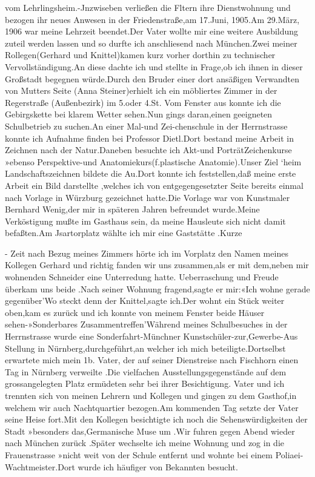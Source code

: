 \documentclass[a4paper,11pt]{article}
\begin{document}
  vom Lehrlingsheim.-Jnzwiseben verließen die Fltern ihre Dienstwohnung und bezogen ihr neues Anwesen in der Friedenstraße,am 17.Juni, 1905.Am 29.März, 1906 war meine Lehrzeit beendet.Der Vater wollte mir eine weitere Ausbildung zuteil werden lassen und so durfte ich anschliesend nach München.Zwei meiner Rollegen(Gerhard und Knittel)kamen kurz vorher dorthin zu technischer Vervollständigung.An diese dachte ich und stellte in Frage,ob ich ihnen in dieser Großstadt begegnen würde.Durch den Bruder einer dort ansäßigen Verwandten von Mutters Seite (Anna Steiner)erhielt ich ein möbliertes Zimmer in der Regerstraße (Außenbezirk) im 5.oder 4.St. Vom Fenster aus konnte ich die Gebirgskette bei klarem Wetter sehen.Nun gings daran,einen geeigneten Schulbetrieb zu suchen.An einer Mal-und Zei-chenschule in der Herrnstrasse konnte ich Aufnahme finden bei Professor Dietl.Dort bestand meine Arbeit in Zeichnen nach der Natur.Daneben besuchte ich Akt-und PorträtZeichenkurse »ebenso Perspektive-und Anatomiekurs(f.plastische Anatomie).Unser Ziel ‘heim Landschaftszeichnen bildete die Au.Dort konnte ich feststellen,daß meine erste Arbeit ein Bild darstellte ,welches ich von entgegengesetzter Seite bereits einmal nach Vorlage in Würzburg gezeichnet hatte.Die Vorlage war von Kunstmaler Bernhard Wenig,der mir in späteren Jahren befreundet wurde.Meine Verköstigung mußte im Gasthaus sein, da meine Hausleute sich nicht damit befaßten.Am Jsartorplatz wählte ich mir eine Gaststätte .Kurze

- Zeit nach Bezug meines Zimmers hörte ich im Vorplatz den Namen meines Kollegen Gerhard und richtig fanden wir uns zusammen,als er mit dem,neben mir wohnenden Schneider eine Unterredung hatte. Ueberraschung und Freude überkam uns beide .Nach seiner Wohnung fragend,sagte er mir:«Ich wohne gerade gegenüber'Wo steckt denn der Knittel,sagte ich.Der wohnt ein Stück weiter oben,kam es zurück und ich konnte von meinem Fenster beide Häuser sehen-»Sonderbares Zusammentreffen'Während meines Schulbesuches in der Herrnstrasse wurde eine Sonderfahrt-Münchner Kunstschüler-zur,Gewerbe-Aus Stellung in Nürnberg,durchgeführt,an welcher ich mich beteiligte.Dortselbst erwartete mich mein 1b. Vater, der auf seiner Dienstreise nach Fischhorn einen Tag in Nürnberg verweilte .Die vielfachen Ausstellungsgegenstände auf dem grossangelegten Platz ermüdeten sehr bei ihrer Besichtigung. Vater und ich trennten sich von meinen Lehrern und Kollegen und gingen zu dem Gasthof,in welchem wir auch Nachtquartier bezogen.Am kommenden Tag setzte der Vater seine Heise fort.Mit den Kollegen besichtigte ich noch die Sehenswürdigkeiten der Stadt »besonders das,Germanische Muse um .Wir fuhren gegen Abend wieder nach München zurück .Später wechselte ich meine Wohnung und zog in die Frauenstrasse »nicht weit von der Schule entfernt und wohnte bei einem Poliaei-Wachtmeister.Dort wurde ich häufiger von Bekannten besucht.
\end{document}
